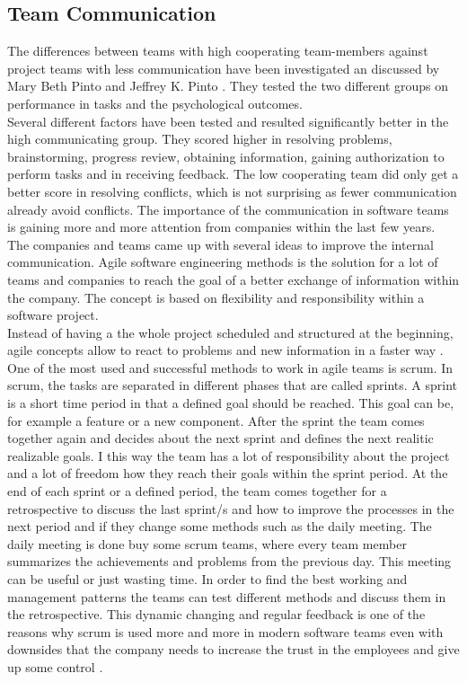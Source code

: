 \subsection{Team Communication}
The differences between teams with high cooperating team-members against project teams with less communication have been investigated an discussed by Mary Beth Pinto and Jeffrey K. Pinto \cite{pinto1990project}. They tested the two different groups on performance in tasks and the psychological outcomes.\\ 
Several different factors have been tested and resulted significantly better in the high communicating group. They scored higher in resolving problems, brainstorming, progress review, obtaining information, gaining authorization to perform tasks and in receiving feedback. The low cooperating team did only get a better score in resolving conflicts, which is not surprising as fewer communication already avoid conflicts. 
\bigbreak
The importance of the communication in software teams is gaining more and more attention from companies within the last few years. The companies and teams came up with several ideas to improve the internal communication. 
Agile software engineering methods is the solution for a lot of teams and companies to reach the goal of a better exchange of information within the company. The concept is based on flexibility and responsibility within a software project.\\
Instead of having a the whole project scheduled and structured at the beginning, agile concepts allow to react to problems and new information in a faster way \cite{chow2008survey}. One of the most used and successful methods to work in agile teams is scrum.
\bigbreak
In scrum, the tasks are separated in different phases that are called sprints. A sprint is a short time period in that a defined goal should be reached. This goal can be, for example a feature or a new component. After the sprint the team comes together again and decides about the next sprint and defines the next realitic realizable goals. I this way the team has a lot of responsibility about the project and a lot of freedom how they reach their goals within the sprint period. At the end of each sprint or a defined period, the team comes together for a retrospective to discuss the last sprint/s and how to improve the processes in the next period and if they change some methods such as the daily meeting. The daily meeting is done buy some scrum teams, where every team member summarizes the achievements and problems from the previous day. This meeting can be useful or just wasting time. In order to find the best working and management patterns the teams can test different methods and discuss them in the retrospective. This dynamic changing and regular feedback is one of the reasons why scrum is used more and more in modern software teams \cite{rising2000scrum} \cite{moe2010teamwork} even with downsides that the company needs to increase the trust in the employees and give up some control \cite{ramesh2006can}.
